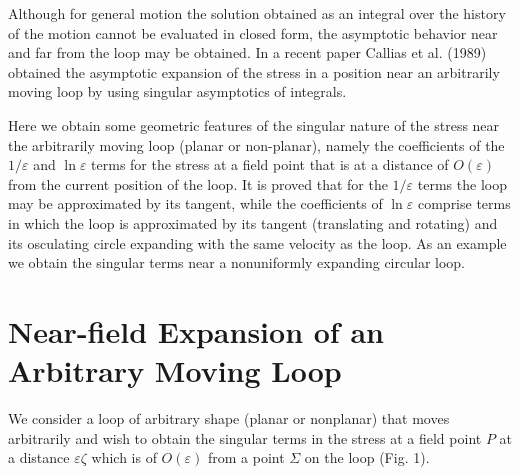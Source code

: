 \documentclass[12pt]{article}
\begin{document}
Although for general motion the solution obtained as an integral over the history of the motion cannot be evaluated in closed form, the asymptotic behavior near and far from the loop may be obtained. In a recent paper Callias et al. (1989) obtained the asymptotic expansion of the stress in a position near an arbitrarily moving loop by using singular asymptotics of integrals.

Here we obtain some geometric features of the singular nature of the stress near the arbitrarily moving loop (planar or non-planar), namely the coefficients of the $1/\varepsilon$ and $\ln\varepsilon$ terms for the stress at a field point that is at a distance of $O(\varepsilon)$ from the current position of the loop. It is proved that for the $1/\varepsilon$ terms the loop may be approximated by its tangent, while the coefficients of $\ln\varepsilon$ comprise terms in which the loop is approximated by its tangent (translating and rotating) and its osculating circle expanding with the same velocity as the loop. As an example we obtain the singular terms near a nonuniformly expanding circular loop.

\section{Near-field Expansion of an Arbitrary Moving Loop}

We consider a loop of arbitrary shape (planar or nonplanar) that moves arbitrarily and wish to obtain the singular terms in the stress at a field point $P$ at a distance $\varepsilon\zeta$ which is of $O(\varepsilon)$ from a point $\Sigma$ on the loop (Fig. 1).
\end{document}
